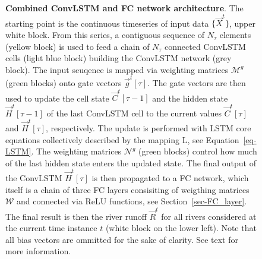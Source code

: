 \documentclass[
]{agujournal2019}
\begin{document}
\begin{figure}


\caption{\label{fig-ConvLSTM_FC}\textbf{Combined ConvLSTM and FC network
architecture}. The starting point is the continuous timeseries of input
data \(\{\vec{X}^t\}\), upper white block. From this series, a
contiguous sequence of \(N_\tau\) elements (yellow block) is used to
feed a chain of \(N_\tau\) connected ConvLSTM cells (light blue block)
building the ConvLSTM network (grey block). The input seuqence is mapped
via weighting matrices \(\pmb{\mathcal{M}}^g\) (green blocks) onto gate
vectors \(\vec{g}^t[\tau]\). The gate vectors are then used to update
the cell state \(\vec{C}^t[\tau-1]\) and the hidden state
\(\vec{H}^t[\tau-1]\) of the last ConvLSTM cell to the current values
\(\vec{C}^t[\tau]\) and \(\vec{H}^t[\tau]\), respectively. The update is
performed with LSTM core equations collectively described by the mapping
L, see Equation~\ref{eq-LSTM}. The weighting matrices
\(\pmb{\mathcal{N}}^g\) (green blocks) control how much of the last
hidden state enters the updated state. The final output of the ConvLSTM
\(\vec{H}^t[\tau]\) is then propagated to a FC network, which itself is
a chain of three FC layers consisiting of weigthing matrices
\(\pmb{\mathcal{W}}\) and connected via ReLU functions, see
Section~\ref{sec-FC_layer}. The final result is then the river runoff
\(\vec{R}^t\) for all rivers considered at the current time instance
\(t\) (white block on the lower left). Note that all bias vectors are
ommitted for the sake of clarity. See text for more information.}

\end{figure}%
\end{document}
